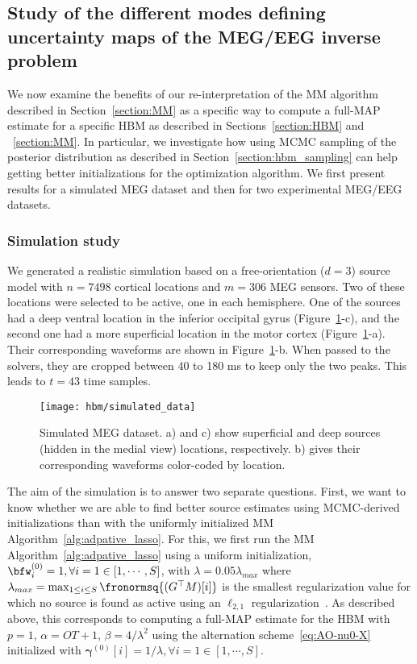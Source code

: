 \subsection{Study of the different modes defining uncertainty maps of the MEG/EEG inverse problem}

We now examine the benefits of our re-interpretation of the MM algorithm described in Section~\ref{section:MM} as a specific way to compute a full-MAP estimate for a specific HBM as described in Sections~\ref{section:HBM} and ~\ref{section:MM}.
In particular, we investigate how using MCMC sampling of the posterior distribution as described in Section~\ref{section:hbm_sampling} can help getting better initializations for the optimization algorithm.
We first present results for a simulated MEG dataset and then for two experimental MEG/EEG datasets.

\subsubsection{Simulation study}
We generated a realistic simulation based on a free-orientation ($d=3$) source model with $n=7498$ cortical locations and $m=306$ MEG sensors. Two of these locations were selected to be active, one in each hemisphere. One of the sources had a deep ventral location in the inferior occipital gyrus (Figure~\ref{fig:simulated_data}-c), and the second one had a more superficial location in the motor cortex (Figure~\ref{fig:simulated_data}-a). Their corresponding waveforms are shown in Figure~\ref{fig:simulated_data}-b. When passed to the solvers, they are cropped between 40 to 180 ms to keep only the two peaks. This leads to $t=43$ time samples.

\begin{figure}[htp]
	\centering
	\texttt{[image: hbm/simulated\_data]}%

	\caption{Simulated MEG dataset. a) and c) show superficial and deep sources (hidden in the medial view) locations, respectively. b) gives their corresponding waveforms color-coded by location.}
	\label{fig:simulated_data}
\end{figure}

The aim of the simulation is to answer two separate questions. First, we want to know whether we are able to find better source estimates using MCMC-derived initializations than with the uniformly initialized MM Algorithm~\ref{alg:adpative_lasso}.
For this, we first run the MM Algorithm~\ref{alg:adpative_lasso} using a uniform initialization, \ie $\bfw^{(0)}_{i} = 1, \forall i=1\in [1,\cdots,S]$, with $\lambda = 0.05\lambda_{max}$ where $\lambda_{max}= \max_{1 \leq i \leq S} \fronormsq{(G^\top M)[i]}$ is the smallest regularization value for which no source is found as active using an $\ell_{2,1}$ regularization~\cite{Ndiaye_Fercoq_Gramfort_Salmon15,strohmeier-etal:16}. As described above, this corresponds to computing a full-MAP estimate for the HBM with $p=1$, $\alpha = OT +1 $, $\beta = 4/\lambda^2$ using the alternation scheme~\eqref{eq:AO-nu0-X} initialized with $\mathbf{\gamma}^{(0)}[i] = 1/\lambda, \forall i=1\in [1, \cdots, S]$.


